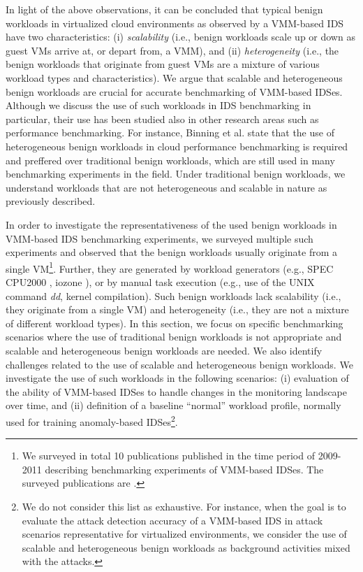 In light of the above observations, it can be concluded that typical benign workloads in virtualized cloud environments as observed by a VMM-based IDS have two characteristics: (i) \emph{scalability} (i.e., benign workloads scale up or down as guest VMs arrive at, or depart from, a VMM), and (ii) \emph{heterogeneity} (i.e., the benign workloads that originate from guest VMs are a mixture of various workload types and characteristics). We argue that scalable and heterogeneous benign workloads are crucial for accurate benchmarking of VMM-based IDSes. Although we discuss the use of such workloads in IDS benchmarking in particular, their use has been studied also in other research areas such as performance benchmarking. For instance, Binning et al. \cite{binning:how} state that the use of heterogeneous benign workloads in cloud performance benchmarking is required and preffered over traditional benign workloads, which are still used in many benchmarking experiments in the field. Under traditional benign workloads, we understand workloads that are not heterogeneous and scalable in nature as previously described. 

In order to investigate the representativeness of the used benign workloads in VMM-based IDS benchmarking experiments, we surveyed multiple such experiments and observed that the benign workloads usually originate from a single VM\footnote{We surveyed in total 10 publications published in the time period of 2009-2011 describing benchmarking experiments of VMM-based IDSes. The surveyed publications are \cite{lombardi:secure, hai:avmm-based, bharadwaja:axen, hai:vmfence, riley:guest, dunlap:revirt, laureano:protecting, srivastava:secure, nascimento:anomaly_based, kong:adjointvm}.}. Further, they are generated by workload generators (e.g., SPEC CPU2000 \cite{spec:cpu2000}, iozone \cite{iozone}), or by manual task execution (e.g., use of the UNIX command \emph{dd}, kernel compilation). Such benign workloads lack scalability (i.e., they originate from a single VM) and heterogeneity (i.e., they are not a mixture of different workload types). In this section, we focus on specific benchmarking scenarios where the use of traditional benign workloads is not appropriate and scalable and heterogeneous benign workloads are needed. We also identify challenges related to the use of scalable and heterogeneous benign workloads. We investigate the use of such workloads in the following scenarios: (i) evaluation of the ability of VMM-based IDSes to handle changes in the monitoring landscape over time, and (ii) definition of a baseline ``normal'' workload profile, normally used for training anomaly-based IDSes\footnote{We do not consider this list as exhaustive. For instance, when the goal is to evaluate the attack detection accuracy of a VMM-based IDS in attack scenarios representative for virtualized environments, we consider the use of scalable and heterogeneous benign workloads as background activities mixed with the attacks.}. 

